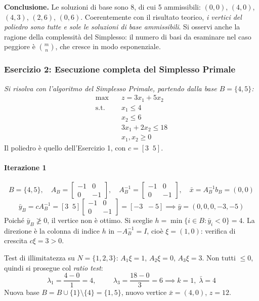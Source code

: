 \documentclass[12pt]{extarticle} %
\begin{document}
\noindent\textbf{Conclusione.} Le soluzioni di base sono 8, di cui 5 ammissibili: $(0,0)$, $(4,0)$, $(4,3)$, $(2,6)$, $(0,6)$. Coerentemente con il risultato teorico, \textit{i vertici del poliedro sono tutte e sole le soluzioni di base ammissibili}. Si osservi anche la ragione della complessità del Simplesso: il numero di basi da esaminare nel caso peggiore è $\binom{m}{n}$, che cresce in modo esponenziale.

\subsubsection{Esercizio 2: Esecuzione completa del Simplesso Primale}
\textit{Si risolva con l'algoritmo del Simplesso Primale, partendo dalla base $B = \{4,5\}$:}
\[
\begin{aligned}
\max \quad & z = 3x_1 + 5x_2 \\
\text{s.t.} \quad & x_1 \le 4 \\
& x_2 \le 6 \\
& 3x_1 + 2x_2 \le 18 \\
& x_1, x_2 \ge 0
\end{aligned}
\]
Il poliedro è quello dell'Esercizio 1, con $c = [3 \;\; 5]$.

\paragraph{Iterazione 1}
\[
B = \{4,5\}, \quad A_B = \begin{bmatrix} -1 & 0\\ 0 & -1\end{bmatrix}, \quad A_B^{-1} = \begin{bmatrix} -1 & 0\\ 0 & -1\end{bmatrix}, \quad \bar{x} = A_B^{-1}b_B = (0,0)
\]
\[
\bar{y}_B = cA_B^{-1} = [3 \;\; 5]\begin{bmatrix} -1 & 0\\ 0 & -1\end{bmatrix} = [-3 \;\; -5] \implies \bar{y} = (0,0,0,-3,-5)
\]
Poiché $\bar{y}_B \not\ge 0$, il vertice non è ottimo. Si sceglie $h = \min\{i \in B : \bar{y}_i < 0\} = 4$. La direzione è la colonna di indice $h$ in $-A_B^{-1} = I$, cioè $\xi = (1,0)$: verifica di crescita $c\xi = 3 > 0$.

\noindent Test di illimitatezza su $N = \{1,2,3\}$: $A_1\xi = 1$, $A_2\xi = 0$, $A_3\xi = 3$. Non tutti $\le 0$, quindi si prosegue col \textit{ratio test}:
\[
\lambda_1 = \frac{4 - 0}{1} = 4, \hspace{1cm} \lambda_3 = \frac{18-0}{3} = 6 \implies k = 1, \; \bar{\lambda} = 4
\]
Nuova base $B = B \cup \{1\} \setminus \{4\} = \{1,5\}$, nuovo vertice $\bar{x} = (4,0)$, $z = 12$.
\end{document}
